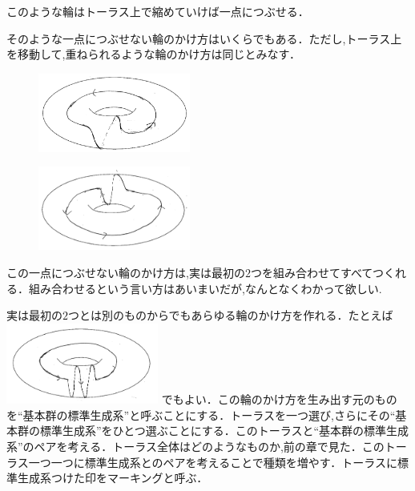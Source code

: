 このような輪はトーラス上で縮めていけば一点につぶせる．

そのような一点につぶせない輪のかけ方はいくらでもある．ただし,トーラス上を移動して,重ねられるような輪のかけ方は同じとみなす．\\
\begin{figure}[h]
\begin{minipage}{0.5\hsize}
\includegraphics[width=5cm]{asaka12.png}\\
\end{minipage}
\begin{minipage}{0.5\hsize}
\includegraphics[width=5cm]{asaka121.png}\\
\end{minipage}
\end{figure}
この一点につぶせない輪のかけ方は,実は最初の$2$つを組み合わせてすべてつくれる．組み合わせるという言い方はあいまいだが,なんとなくわかって欲しい.

実は最初の$2$つとは別のものからでもあらゆる輪のかけ方を作れる．たとえば\\
\includegraphics[width=5cm]{asaka14.png}
でもよい．この輪のかけ方を生み出す元のものを``基本群の標準生成系''と呼ぶことにする．トーラスを一つ選び,さらにその``基本群の標準生成系''をひとつ選ぶことにする．このトーラスと``基本群の標準生成系''のペアを考える．トーラス全体はどのようなものか,前の章で見た．このトーラス一つ一つに標準生成系とのペアを考えることで種類を増やす．トーラスに標準生成系つけた印をマーキングと呼ぶ．

